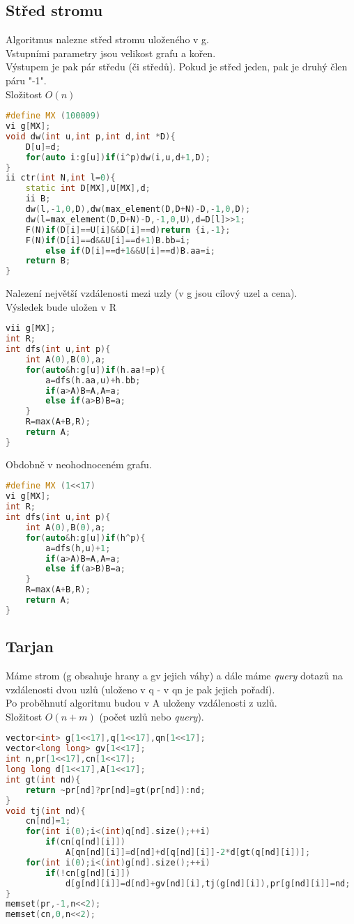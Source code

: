 \documentclass[11pt]{article}
\begin{document}
\subsection{Střed stromu}
Algoritmus nalezne střed stromu uloženého v \textsf{g}.
\\Vstupními parametry jsou velikost grafu a kořen.
\\Výstupem je pak pár středu (či středů). Pokud je střed jeden, pak je druhý člen páru "-1".
\\Složitost $O(n)$
\begin{lstlisting}[language=C++]
#define MX (100009)
vi g[MX];
void dw(int u,int p,int d,int *D){
    D[u]=d;
    for(auto i:g[u])if(i^p)dw(i,u,d+1,D);
}
ii ctr(int N,int l=0){
    static int D[MX],U[MX],d;
    ii B;
    dw(l,-1,0,D),dw(max_element(D,D+N)-D,-1,0,D);
    dw(l=max_element(D,D+N)-D,-1,0,U),d=D[l]>>1;
    F(N)if(D[i]==U[i]&&D[i]==d)return {i,-1};
    F(N)if(D[i]==d&&U[i]==d+1)B.bb=i;
        else if(D[i]==d+1&&U[i]==d)B.aa=i;
    return B;
}
\end{lstlisting}
Nalezení největší vzdálenosti mezi uzly (v \textsf{g} jsou cílový uzel a cena).
\\Výsledek bude uložen v \textsf{R}
\begin{lstlisting}[language=C++]
vii g[MX];
int R;
int dfs(int u,int p){
    int A(0),B(0),a;
    for(auto&h:g[u])if(h.aa!=p){
        a=dfs(h.aa,u)+h.bb;
        if(a>A)B=A,A=a;
        else if(a>B)B=a;
    }
    R=max(A+B,R);
    return A;
}
\end{lstlisting}
Obdobně v neohodnoceném grafu.
\begin{lstlisting}[language=C++]
#define MX (1<<17)
vi g[MX];
int R;
int dfs(int u,int p){
    int A(0),B(0),a;
    for(auto&h:g[u])if(h^p){
        a=dfs(h,u)+1;
        if(a>A)B=A,A=a;
        else if(a>B)B=a;
    }
    R=max(A+B,R);
    return A;
}
\end{lstlisting}
\subsection{Tarjan}
Máme strom (\textsf{g} obsahuje hrany a \textsf{gv} jejich váhy) a dále máme \textit{query} dotazů na vzdálenosti dvou uzlů (uloženo v \textsf{q} - v \textsf{qn} je pak jejich pořadí).
\\Po proběhnutí algoritmu budou v \textsf{A} uloženy vzdálenosti z uzlů.
\\Složitost $O(n+m)$ (počet uzlů nebo \textit{query}).
\begin{lstlisting}[language=C++]
vector<int> g[1<<17],q[1<<17],qn[1<<17];
vector<long long> gv[1<<17];
int n,pr[1<<17],cn[1<<17];
long long d[1<<17],A[1<<17];
int gt(int nd){
    return ~pr[nd]?pr[nd]=gt(pr[nd]):nd;
}
void tj(int nd){
    cn[nd]=1;
    for(int i(0);i<(int)q[nd].size();++i)
        if(cn[q[nd][i]])
            A[qn[nd][i]]=d[nd]+d[q[nd][i]]-2*d[gt(q[nd][i])];
    for(int i(0);i<(int)g[nd].size();++i)
        if(!cn[g[nd][i]])
            d[g[nd][i]]=d[nd]+gv[nd][i],tj(g[nd][i]),pr[g[nd][i]]=nd;
}
memset(pr,-1,n<<2);
memset(cn,0,n<<2);
\end{lstlisting}
\end{document}
